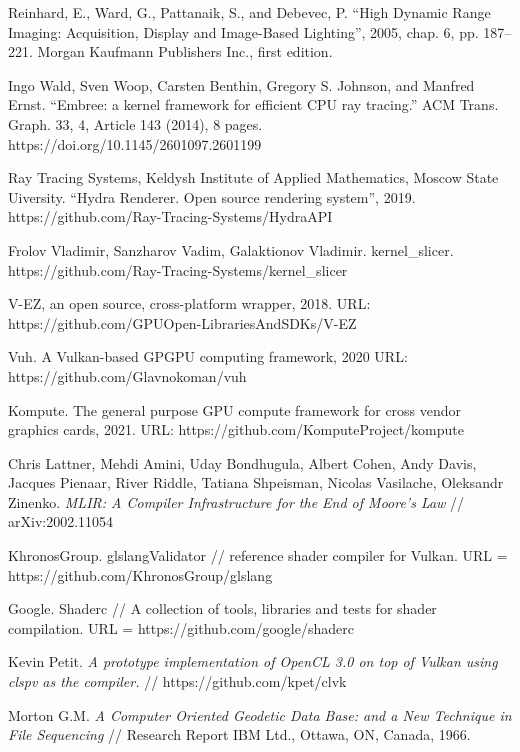 \documentclass[11pt,fleqn,english,russian]{report} %
\begin{document}
\begin{thebibliography}{10}
	 Reinhard, E., Ward, G., Pattanaik, S., and Debevec, P. ``High Dynamic Range Imaging: Acquisition, Display and Image-Based Lighting'', 2005, chap. 6, pp. 187–221. Morgan Kaufmann Publishers Inc., first edition.
	
	 Ingo Wald, Sven Woop, Carsten Benthin, Gregory S. Johnson, and Manfred Ernst. ``Embree: a kernel framework for efficient CPU ray tracing.'' ACM Trans. Graph. 33, 4, Article 143 (2014), 8 pages. https://doi.org/10.1145/2601097.2601199
	
	 Ray Tracing Systems, Keldysh Institute of Applied Mathematics, Moscow State Uiversity. ``Hydra Renderer. Open source rendering system'', 2019.
	https://github.com/Ray-Tracing-Systems/HydraAPI
	
	 Frolov Vladimir, Sanzharov Vadim, Galaktionov Vladimir. kernel\_slicer. https://github.com/Ray-Tracing-Systems/kernel\_slicer
	
	 V-EZ, an open source, cross-platform wrapper, 2018. URL: https://github.com/GPUOpen-LibrariesAndSDKs/V-EZ
	
	 Vuh. A Vulkan-based GPGPU computing framework, 2020 URL: https://github.com/Glavnokoman/vuh
	
	 Kompute. The general purpose GPU compute framework for cross vendor graphics cards, 2021. URL: https://github.com/KomputeProject/kompute
	
	 Chris Lattner, Mehdi Amini, Uday Bondhugula, Albert Cohen, Andy Davis, Jacques Pienaar, River Riddle, Tatiana Shpeisman, Nicolas Vasilache, Oleksandr Zinenko. \textit{MLIR: A Compiler Infrastructure for the End of Moore's Law} // arXiv:2002.11054
	
	 KhronosGroup. glslangValidator // reference shader compiler for Vulkan. URL = https://github.com/KhronosGroup/glslang
	
	 Google. Shaderc // A collection of tools, libraries and tests for shader compilation. URL = https://github.com/google/shaderc
	
	 Kevin Petit. \textit{A prototype implementation of OpenCL 3.0 on top of Vulkan using clspv as the compiler.} // https://github.com/kpet/clvk
	
	 Morton G.M. \textit{A Computer Oriented Geodetic Data Base: and a New Technique in File Sequencing} // Research Report IBM Ltd., Ottawa, ON, Canada, 1966.
	

\end{thebibliography}
\end{document}
